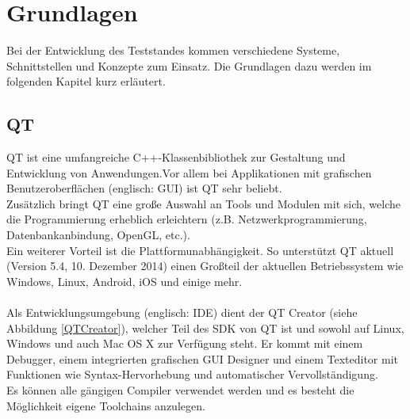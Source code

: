 \chapter{Grundlagen}
\label{chapter_Grundlagen}

Bei der Entwicklung des Teststandes kommen verschiedene Systeme, Schnittstellen und Konzepte zum Einsatz. Die Grundlagen dazu werden im folgenden Kapitel kurz erläutert.

\section{QT}
QT ist eine umfangreiche C++-Klassenbibliothek zur Gestaltung und Entwicklung von Anwendungen.Vor allem bei Applikationen mit grafischen Benutzeroberflächen (englisch: \ac{GUI}) ist QT sehr beliebt. \\
Zusätzlich bringt QT eine große Auswahl an Tools und Modulen mit sich, welche die Programmierung erheblich erleichtern (z.B. Netzwerkprogrammierung, Datenbankanbindung, OpenGL, etc.). \\
Ein weiterer Vorteil ist die Plattformunabhängigkeit. So unterstützt QT aktuell (Version 5.4, 10. Dezember 2014) einen Großteil der aktuellen Betriebssystem wie Windows, Linux, Android, iOS und einige mehr.
\\\\
Als Entwicklungsumgebung (englisch: \ac{IDE}) dient der QT Creator (siehe Abbildung \ref{QTCreator}), welcher Teil des \ac{SDK} von QT ist und sowohl auf Linux, Windows und auch Mac OS X zur Verfügung steht. Er kommt mit einem Debugger, einem integrierten grafischen \ac{GUI} Designer und einem Texteditor mit Funktionen wie Syntax-Hervorhebung und automatischer Vervollständigung. \\
Es können alle gängigen Compiler verwendet werden und es besteht die Möglichkeit eigene Toolchains anzulegen. 

